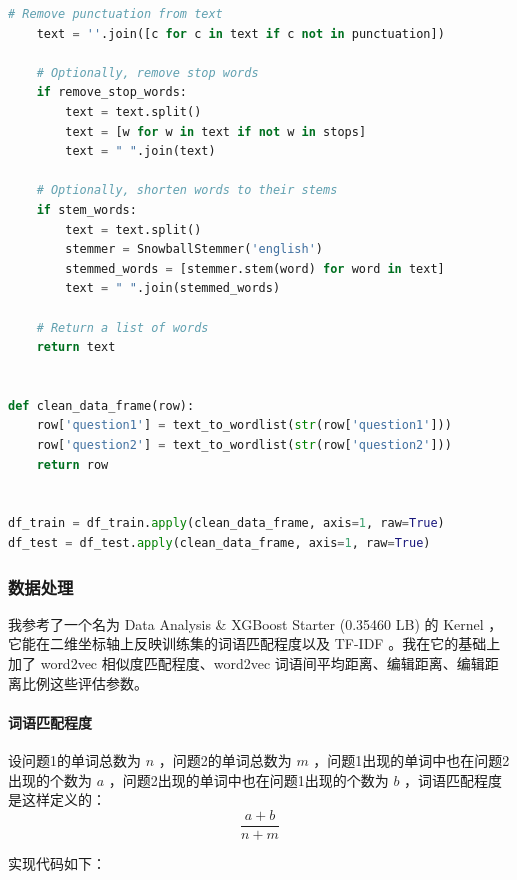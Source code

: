 \documentclass{article}
\begin{document}
\begin{lstlisting}[language=python]
    # Remove punctuation from text
    text = ''.join([c for c in text if c not in punctuation])

    # Optionally, remove stop words
    if remove_stop_words:
        text = text.split()
        text = [w for w in text if not w in stops]
        text = " ".join(text)

    # Optionally, shorten words to their stems
    if stem_words:
        text = text.split()
        stemmer = SnowballStemmer('english')
        stemmed_words = [stemmer.stem(word) for word in text]
        text = " ".join(stemmed_words)

    # Return a list of words
    return text


def clean_data_frame(row):
    row['question1'] = text_to_wordlist(str(row['question1']))
    row['question2'] = text_to_wordlist(str(row['question2']))
    return row


df_train = df_train.apply(clean_data_frame, axis=1, raw=True)
df_test = df_test.apply(clean_data_frame, axis=1, raw=True)
\end{lstlisting}

\subsubsection{数据处理}

我参考了一个名为 Data Analysis \& XGBoost Starter (0.35460 LB) 的 Kernel ，它能在二维坐标轴上反映训练集的词语匹配程度以及 TF-IDF 。我在它的基础上加了 word2vec 相似度匹配程度、word2vec 词语间平均距离、编辑距离、编辑距离比例这些评估参数。

\paragraph{词语匹配程度}

设问题1的单词总数为 $n$ ，问题2的单词总数为 $m$ ，问题1出现的单词中也在问题2出现的个数为 $a$ ，问题2出现的单词中也在问题1出现的个数为 $b$ ，词语匹配程度是这样定义的：
$$\frac{a + b}{n + m}$$

实现代码如下：
\end{document}
